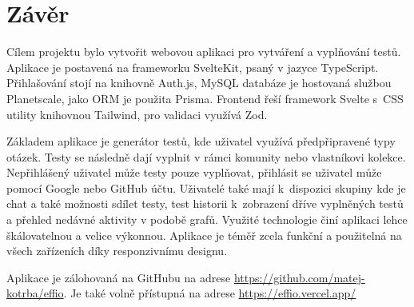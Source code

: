 \documentclass[12pt, a4paper,
openright
]{report}
\begin{document}
\chapter*{Závěr}
	
Cílem projektu bylo vytvořit webovou aplikaci pro vytváření a vyplňování testů. Aplikace je postavená na frameworku SvelteKit, psaný v jazyce TypeScript. Přihlašování stojí na knihovně Auth.js, MySQL databáze je hostovaná službou Planetscale, jako ORM je použita Prisma. Frontend řeší framework Svelte s~CSS utility knihovnou Tailwind, pro validaci využívá Zod.

Základem aplikace je generátor testů, kde uživatel využívá předpřipravené typy otázek. Testy se následně dají vyplnit v rámci komunity nebo vlastníkovi kolekce. Nepřihlášený uživatel může testy pouze vyplňovat, přihlásit se uživatel může pomocí Google nebo GitHub účtu. Uživatelé také mají k~dispozici skupiny kde je chat a také možnosti sdílet testy, test historii k~zobrazení dříve vyplněných testů a přehled nedávné aktivity v podobě grafů. Využité technologie činí aplikaci lehce škálovatelnou a velice výkonnou. Aplikace je téměř zcela funkční a použitelná na všech zařízeních díky responzivnímu designu.

\noindent Aplikace je zálohovaná na GitHubu na adrese \url{https://github.com/matej-kotrba/effio}.
Je také volně přístupná na adrese \url{https://effio.vercel.app/}
	
\end{document}
